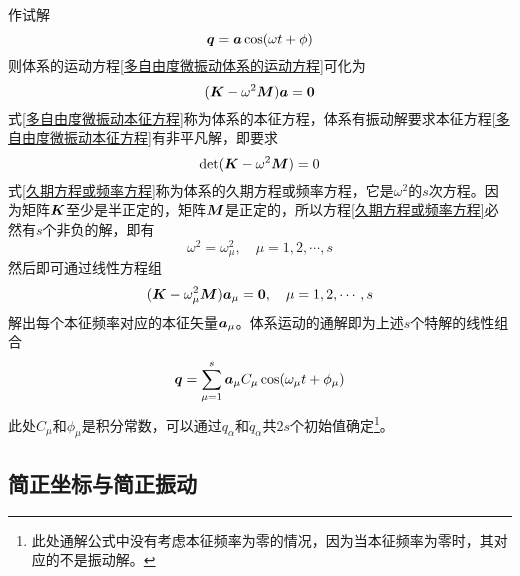 作试解
\begin{equation*}
	\boldsymbol{q} = \boldsymbol{a} \cos (\omega t+\phi)
\end{equation*}
则体系的运动方程\eqref{多自由度微振动体系的运动方程}可化为
\begin{equation}
	(\boldsymbol{K} - \omega^2 \boldsymbol{M})\boldsymbol{a} = \boldsymbol{0}
	\label{多自由度微振动本征方程}
\end{equation}
式\eqref{多自由度微振动本征方程}称为体系的{\heiti 本征方程}，体系有振动解要求本征方程\eqref{多自由度微振动本征方程}有非平凡解，即要求
\begin{equation}
	\det (\boldsymbol{K} - \omega^2 \boldsymbol{M}) = 0
	\label{久期方程或频率方程}
\end{equation}
式\eqref{久期方程或频率方程}称为体系的{\heiti 久期方程}或{\heiti 频率方程}，它是$\omega^2$的$s$次方程。因为矩阵$\boldsymbol{K}$至少是半正定的，矩阵$\boldsymbol{M}$是正定的，所以方程\eqref{久期方程或频率方程}必然有$s$个非负的解，即有
\begin{equation*}
	\omega^2 = \omega_\mu^2,\quad \mu = 1,2,\cdots,s
\end{equation*}
然后即可通过线性方程组
\begin{equation*}
	(\boldsymbol{K} - \omega_\mu^2 \boldsymbol{M}) \boldsymbol{a}_\mu = \boldsymbol{0},\quad \mu = 1,2,\cdots,s
\end{equation*}
解出每个本征频率对应的本征矢量$\boldsymbol{a}_\mu$。体系运动的通解即为上述$s$个特解的线性组合
\begin{equation}
	\boldsymbol{q} = \sum_{\mu=1}^s \boldsymbol{a}_\mu C_\mu \cos (\omega_\mu t + \phi_\mu)
	\label{多自由度微振动通解}
\end{equation}
此处$C_\mu$和$\phi_\mu$是积分常数，可以通过$q_\alpha$和$\dot{q}_\alpha$共$2s$个初始值确定\footnote{此处通解公式中没有考虑本征频率为零的情况，因为当本征频率为零时，其对应的不是振动解。}。

\subsection{简正坐标与简正振动}

